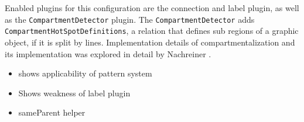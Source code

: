 Enabled plugins for this configuration are the connection and label plugin, as well as the \texttt{CompartmentDetector} plugin. The \texttt{CompartmentDetector} adds \texttt{CompartmentHotSpotDefinitions}, a relation that defines sub regions of a graphic object, if it is split by lines. Implementation details of compartmentalization and its implementation was explored in detail by Nachreiner \cite{nachreiner_couchedit_2020}.

\begin{itemize}
  \item shows applicability of pattern system
  \item Shows weakness of label plugin
  \item sameParent helper
\end{itemize}
